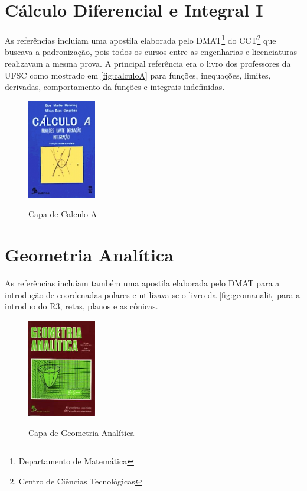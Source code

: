 \documentclass[
	12pt,				%
	openright,			%
	oneside,			%
	a4paper,			%
	english,			%
	french,				%
	spanish,			%
	brazil				%
	]{abntex2}
\begin{document}
\section{Cálculo Diferencial e Integral I}\label{sec:cdi1}
As referências incluíam uma apostila elaborada pelo DMAT\footnote{Departamento de Matemática} do CCT\footnote{Centro de Ciências Tecnológicas} que buscava
a padronização, pois todos os cursos entre as engenharias e licenciaturas realizavam a
mesma prova. A principal referência era o livro  dos professores da UFSC como mostrado em \autoref{fig:calculoA} para funções, inequações, limites, derivadas, comportamento da funções e integrais indefinidas.
\begin{figure}[!htb] %
	\caption{Capa de Calculo A}
	\centering
	\includegraphics[width=3cm]{calculoA.jpg}
	\label{fig:calculoA}
\end{figure}

\section{Geometria Analítica}\label{sec:alg1}
As referências incluíam também uma apostila elaborada pelo DMAT para a introdução de coordenadas polares e utilizava-se o livro  da \autoref{fig:geomanalit} para a introduo do R3, retas, planos e as cônicas.
\begin{figure}[!htb]
	\caption{Capa de Geometria Analítica}
	\centering
	\includegraphics[width=3cm]{geometriaanalitica.jpg}
	\label{fig:geomanalit}
\end{figure}
\end{document}

